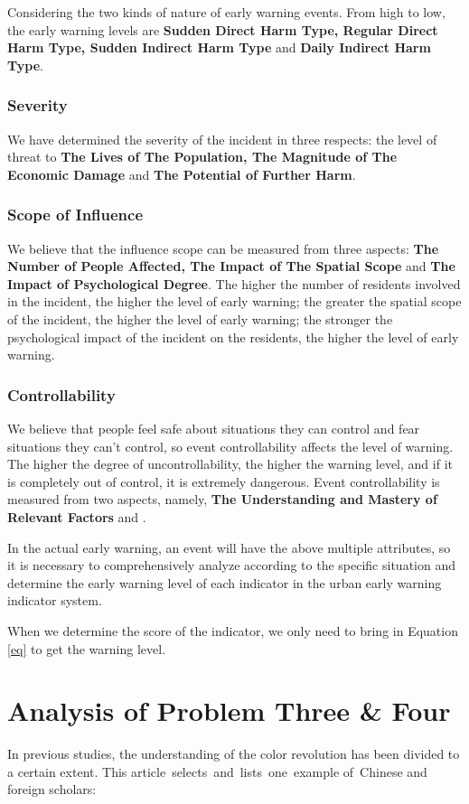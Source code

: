 \documentclass[12pt]{article}  %
\begin{document}
Considering the two kinds of nature of early warning events. From high to low, the early warning levels are \textbf{Sudden Direct Harm Type, Regular Direct Harm Type, Sudden Indirect Harm Type} and \textbf{Daily Indirect Harm Type}.
\subsubsection{Severity}
We have determined the severity of the incident in three respects: the level of threat to \textbf{The Lives of The Population, The Magnitude of The Economic Damage} and \textbf{The Potential of Further Harm}.
\subsubsection{Scope of Influence}
We believe that the influence scope can be measured from three aspects: \textbf{The Number of People Affected, The Impact of The Spatial Scope} and \textbf{The Impact of Psychological Degree}. The higher the number of residents involved in the incident, the higher the level of early warning; the greater the spatial scope of the incident, the higher the level of early warning; the stronger the psychological impact of the incident on the residents, the higher the level of early warning.
\subsubsection{Controllability}
We believe that people feel safe about situations they can control and fear situations they can't control, so event controllability affects the level of warning. The higher the degree of uncontrollability, the higher the warning level, and if it is completely out of control, it is extremely dangerous. Event controllability is measured from two aspects, namely, \textbf{The Understanding and Mastery of Relevant Factors} and .

In the actual early warning, an event will have the above multiple attributes, so it is necessary to comprehensively analyze according to the specific situation and determine the early warning level of each indicator in the urban early warning indicator system.

When we determine the score of the indicator, we only need to bring in Equation \ref{eq} to get the warning level.
\section{Analysis of Problem Three \& Four}
In previous studies, the understanding of the color revolution has been divided to a certain extent. This article selects and lists one example of Chinese and foreign scholars:
\end{document}
